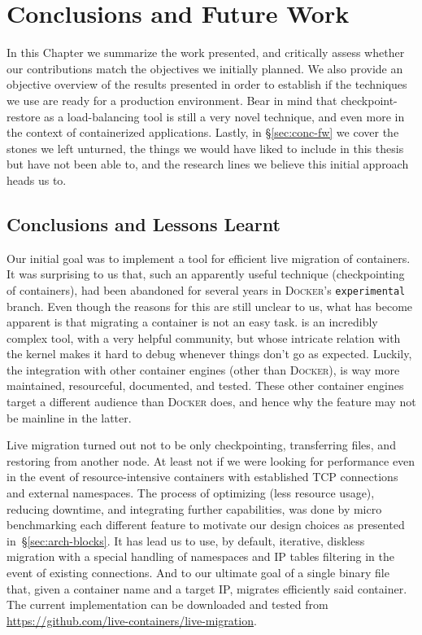 \chapter{Conclusions and Future Work} \label{chap:conclusion}

In this Chapter we summarize the work presented, and critically assess whether our contributions match the objectives we initially planned.
We also provide an objective overview of the results presented in order to establish if the techniques we use are ready for a production environment.
Bear in mind that checkpoint-restore as a load-balancing tool is still a very novel technique, and even more in the context of containerized applications.
Lastly, in \S\ref{sec:conc-fw} we cover the stones we left unturned, the things we would have liked to include in this thesis but have not been able to, and the research lines we believe this initial approach heads us to.

\section{Conclusions and Lessons Learnt}

Our initial goal was to implement a tool for efficient live migration of containers.
It was surprising to us that, such an apparently useful technique (checkpointing of containers), had been abandoned for several years in \textsc{Docker}'s \texttt{experimental} branch.
Even though the reasons for this are still unclear to us, what has become apparent is that migrating a container is not an easy task.
\criu is an incredibly complex tool, with a very helpful community, but whose intricate relation with the kernel makes it hard to debug whenever things don't go as expected.
Luckily, the integration with other container engines (other than \textsc{Docker}), is way more maintained, resourceful, documented, and tested.
These other container engines target a different audience than \textsc{Docker} does, and hence why the feature may not be mainline in the latter.

Live migration turned out not to be only checkpointing, transferring files, and restoring from another node.
At least not if we were looking for performance even in the event of resource-intensive containers with established TCP connections and external namespaces.
The process of optimizing (less resource usage), reducing downtime, and integrating further capabilities, was done by micro benchmarking each different feature to motivate our design choices as presented in~\S\ref{sec:arch-blocks}.
It has lead us to use, by default, iterative, diskless migration with a special handling of namespaces and IP tables filtering in the event of existing connections.
And to our ultimate goal of a single binary file that, given a container name and a target IP, migrates efficiently said container.
The current implementation can be downloaded and tested from \url{https://github.com/live-containers/live-migration}.

